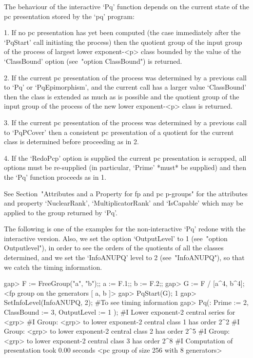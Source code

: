 The behaviour of the interactive `Pq' function  depends  on  the  current
state of the pc presentation stored by the `pq' program:

\beginlist%

\item{1.}
If no pc presentation has yet been computed (the case  immediately  after
the `PqStart' call initiating the process) then the quotient group of the
input group of the process of largest lower exponent-<p> class bounded by
the  value  of  the  `ClassBound'  option  (see~"option  ClassBound")  is
returned.

\item{2.}
If the current pc  presentation  of  the  process  was  determined  by  a
previous call to `Pq' or `PqEpimorphism', and  the  current  call  has  a
larger value `ClassBound' then the  class  is  extended  as  much  as  is
possible and the quotient group of the input group of the process of  the
new lower exponent-<p> class is returned.

\item{3.}
If the current pc  presentation  of  the  process  was  determined  by  a
previous call to `PqPCover'  then  a  consistent  pc  presentation  of  a
quotient for the current class is determined before proceeding as in 2.

\item{4.}
If the `RedoPcp' option  is  supplied  the  current  pc  presentation  is
scrapped, all options must be re-supplied (in particular, `Prime'  *must*
be supplied) and then the `Pq' function proceeds as in 1.

\endlist

See Section~"Attributes and a Property for fp and pc  p-groups"  for  the
attributes   and   property   `NuclearRank',   `MultiplicatorRank'    and
`IsCapable' which may be applied to the group returned by `Pq'.

The following is one of the examples for the non-interactive `Pq'  redone
with the interactive version. Also, we set the option `OutputLevel' to  1
(see~"option   Outputlevel"), in order to see the orders of the quotients
of all the classes determined, and we set  the  `InfoANUPQ'  level  to  2
(see~"InfoANUPQ"), so that we catch the timing information.

\beginexample
gap> F := FreeGroup("a", "b");; a := F.1;; b := F.2;;
gap> G := F / [a^4, b^4];
<fp group on the generators [ a, b ]>
gap> PqStart(G);
1
gap> SetInfoLevel(InfoANUPQ, 2); #To see timing information               
gap> Pq(: Prime := 2, ClassBound := 3, OutputLevel := 1 );
#I  Lower exponent-2 central series for <grp>
#I  Group: <grp> to lower exponent-2 central class 1 has order 2^2
#I  Group: <grp> to lower exponent-2 central class 2 has order 2^5
#I  Group: <grp> to lower exponent-2 central class 3 has order 2^8
#I  Computation of presentation took 0.00 seconds
<pc group of size 256 with 8 generators>
\endexample

